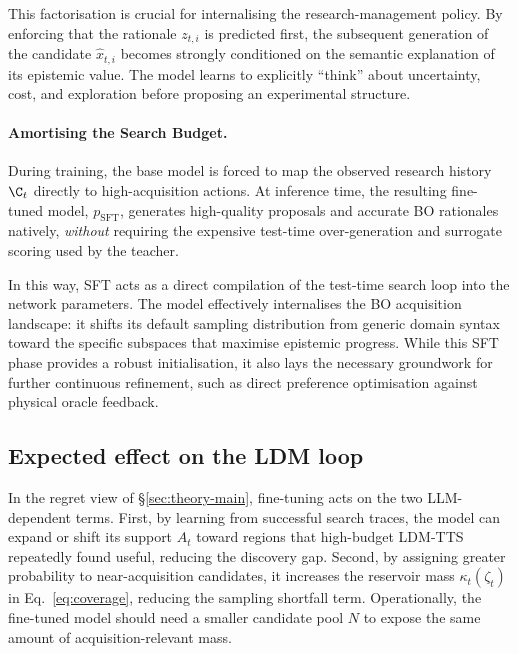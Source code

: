 This factorisation is crucial for internalising the research-management policy. By enforcing that the rationale $z_{t,i}$ is predicted first, the subsequent generation of the candidate $\hat{x}_{t,i}$ becomes strongly conditioned on the semantic explanation of its epistemic value. The model learns to explicitly ``think'' about uncertainty, cost, and exploration before proposing an experimental structure. 

\paragraph{Amortising the Search Budget.}
During training, the base model is forced to map the observed research history $\C_t$ directly to high-acquisition actions. At inference time, the resulting fine-tuned model, $p_{\text{SFT}}$, generates high-quality proposals and accurate BO rationales natively, \emph{without} requiring the expensive test-time over-generation and surrogate scoring used by the teacher. 

In this way, SFT acts as a direct compilation of the test-time search loop into the network parameters. The model effectively internalises the BO acquisition landscape: it shifts its default sampling distribution from generic domain syntax toward the specific subspaces that maximise epistemic progress. While this SFT phase provides a robust initialisation, it also lays the necessary groundwork for further continuous refinement, such as direct preference optimisation against physical oracle feedback.









\subsection{Expected effect on the LDM loop}
\label{sec:finetune-effect}

In the regret view of \S\ref{sec:theory-main}, fine-tuning acts on the two LLM-dependent terms. First, by
learning from successful search traces, the model can expand or shift its support $A_t$ toward regions that
high-budget LDM-TTS repeatedly found useful, reducing the discovery gap. Second, by assigning greater
probability to near-acquisition candidates, it increases the reservoir mass $\kappa_t(\zeta_t)$ in
Eq.~\eqref{eq:coverage}, reducing the sampling shortfall term. Operationally, the fine-tuned model should need
a smaller candidate pool $N$ to expose the same amount of acquisition-relevant mass.

